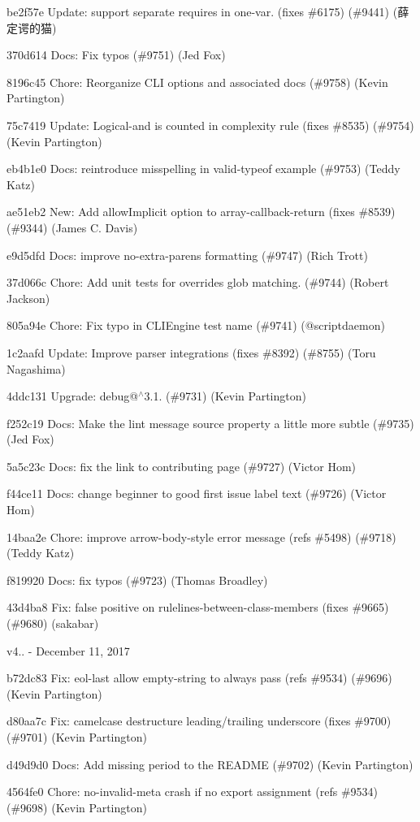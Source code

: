 \begin{DoxyItemize}
\item be2f57e Update\+: support separate requires in one-\/var. (fixes \#6175) (\#9441) (薛定谔的猫)
\item 370d614 Docs\+: Fix typos (\#9751) (Jed Fox)
\item 8196c45 Chore\+: Reorganize CLI options and associated docs (\#9758) (Kevin Partington)
\item 75c7419 Update\+: Logical-\/and is counted in {\ttfamily complexity} rule (fixes \#8535) (\#9754) (Kevin Partington)
\item eb4b1e0 Docs\+: reintroduce misspelling in {\ttfamily valid-\/typeof} example (\#9753) (Teddy Katz)
\item ae51eb2 New\+: Add allow\+Implicit option to array-\/callback-\/return (fixes \#8539) (\#9344) (James C. Davis)
\item e9d5dfd Docs\+: improve no-\/extra-\/parens formatting (\#9747) (Rich Trott)
\item 37d066c Chore\+: Add unit tests for overrides glob matching. (\#9744) (Robert Jackson)
\item 805a94e Chore\+: Fix typo in CLIEngine test name (\#9741) (@scriptdaemon)
\item 1c2aafd Update\+: Improve parser integrations (fixes \#8392) (\#8755) (Toru Nagashima)
\item 4ddc131 Upgrade\+: debug@\texorpdfstring{$^\wedge$}{\string^}3.1. (\#9731) (Kevin Partington)
\item f252c19 Docs\+: Make the lint message {\ttfamily source} property a little more subtle (\#9735) (Jed Fox)
\item 5a5c23c Docs\+: fix the link to contributing page (\#9727) (Victor Hom)
\item f44ce11 Docs\+: change beginner to good first issue label text (\#9726) (Victor Hom)
\item 14baa2e Chore\+: improve arrow-\/body-\/style error message (refs \#5498) (\#9718) (Teddy Katz)
\item f819920 Docs\+: fix typos (\#9723) (Thomas Broadley)
\item 43d4ba8 Fix\+: false positive on rule{\ttfamily lines-\/between-\/class-\/members} (fixes \#9665) (\#9680) (sakabar)
\end{DoxyItemize}

v4.. -\/ December 11, 2017


\begin{DoxyItemize}
\item b72dc83 Fix\+: eol-\/last allow empty-\/string to always pass (refs \#9534) (\#9696) (Kevin Partington)
\item d80aa7c Fix\+: camelcase destructure leading/trailing underscore (fixes \#9700) (\#9701) (Kevin Partington)
\item d49d9d0 Docs\+: Add missing period to the README (\#9702) (Kevin Partington)
\item 4564fe0 Chore\+: no-\/invalid-\/meta crash if no export assignment (refs \#9534) (\#9698) (Kevin Partington)
\end{DoxyItemize}

